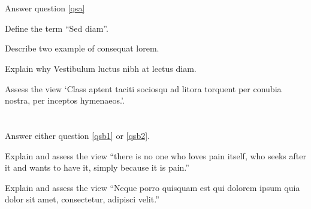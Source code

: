 \documentclass{cie}
\begin{document}
  \candidateinfoboxes{}
  \answeron{}
  \coverpage

  \section{}{
    Answer question \ref{qsa}
  }

  \begin{question}
    \label{qsa}
    \lipsum[2-3]

    \subquestion Define the term ``Sed diam''. 

    \subquestion Describe two example of consequat lorem. 

    \subquestion Explain why Vestibulum luctus nibh at lectus diam. 

    \subquestion Assess the view `Class aptent taciti sociosqu ad litora torquent per conubia nostra,
      per inceptos hymenaeos.'. 

    \printtotalmark
  \end{question}

  \section{}{
    Answer either question \ref{qsb1} or \ref{qsb2}.
  }

  \begin{question}
    \label{qsb1}
    Explain and assess the view ``there is no one who loves pain itself, who seeks after it and wants to
    have it, simply because it is pain.'' 
  \end{question}

  \begin{question}
    \label{qsb2}
    Explain and assess the view ``Neque porro quisquam est qui dolorem ipsum quia dolor sit amet,
    consectetur, adipisci velit.'' 
  \end{question}

  \finalstuff
\end{document}
